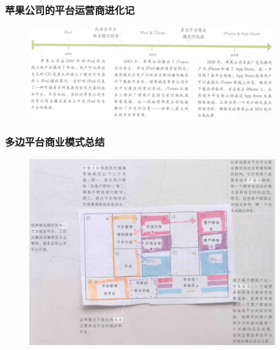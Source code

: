    \subsubsection{苹果公司的平台运营商进化记}

    \begin{figure}[H]
		\centering
        \vspace{-0.5em}
		\includegraphics[width=0.95\textwidth]{img/苹果公司的平台运营商进化记.png}
        \vspace{-0.5em}
	\end{figure}

    \subsubsection{多边平台商业模式总结}

    \begin{figure}[H]
		\centering
        \vspace{-0.5em}
		\includegraphics[width=0.95\textwidth]{img/多边平台商业模式总结.png}
        \vspace{-0.5em}
	\end{figure}

